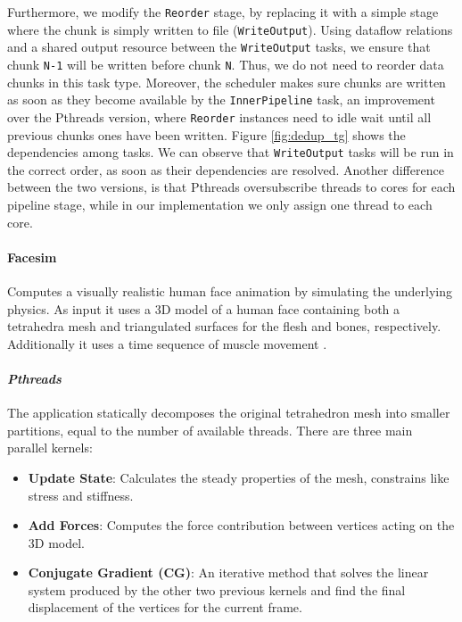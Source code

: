 {Furthermore, we modify the \texttt{Reorder} stage, by replacing it with a simple stage where the chunk is simply written to file (\texttt{WriteOutput}).
Using dataflow relations and a shared output resource between the \texttt{WriteOutput} tasks, we ensure that chunk \texttt{N-1} will be written before chunk \texttt{N}. 
Thus, we do not need to reorder data chunks in this task type.  Moreover, the scheduler makes sure chunks are written as soon as they become available by the \texttt{InnerPipeline} task, an improvement
over the Pthreads version, where \texttt{Reorder} instances need to idle wait until all previous chunks ones have been written.  
Figure \ref{fig:dedup_tg} shows the dependencies among tasks.  We can observe that \texttt{WriteOutput} tasks will be run in the correct
order, as soon as their dependencies are resolved.
Another difference between the two versions, is that Pthreads 
oversubscribe threads to cores for each pipeline stage, while in our implementation we only assign one thread to each core.


\paragraph{\textbf{Facesim}}
Computes a visually realistic human face animation by simulating the underlying physics.  As input it uses a 3D model of a human face 
containing both a tetrahedra mesh and triangulated surfaces for the flesh and bones, respectively. Additionally it uses 
a time sequence of muscle movement \cite{Sifakis:2005:ADF:1073204.1073208}.

\paragraph{\textit{Pthreads}}
The application statically decomposes the original tetrahedron mesh into smaller partitions, equal to the number of available threads.
There are three main parallel kernels:
\begin{itemize}
  \item \textbf{Update State}: Calculates the steady properties of the mesh, constrains like stress and stiffness.  
  \item \textbf{Add Forces}: Computes the force contribution between vertices acting on the 3D model.
  \item \textbf{Conjugate Gradient (CG)}:  An iterative method that solves the linear system produced by the 
other two previous kernels and find the final displacement of the vertices for the current frame.
\end{itemize}

}
